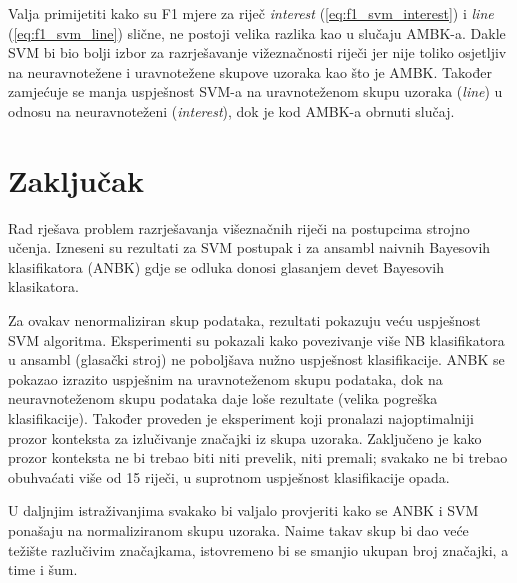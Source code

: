 \documentclass[10pt, a4paper]{article}
\begin{document}
Valja primijetiti kako su F1 mjere za riječ \emph{interest} (\ref{eq:f1_svm_interest}) i \emph{line} 
(\ref{eq:f1_svm_line}) slične, ne postoji velika razlika kao u slučaju AMBK-a.
Dakle SVM bi bio bolji izbor za razrješavanje vižeznačnosti riječi jer
nije toliko osjetljiv na neuravnotežene i uravnotežene skupove uzoraka
kao što je AMBK.
Također zamjećuje se manja uspješnost SVM-a na uravnoteženom
skupu uzoraka (\emph{line}) u odnosu na neuravnoteženi (\emph{interest}), 
dok je kod AMBK-a obrnuti slučaj.

\section{Zaključak}
Rad rješava problem razrješavanja višeznačnih riječi na postupcima
strojno učenja. Izneseni su rezultati za SVM postupak i za
ansambl naivnih Bayesovih klasifikatora (ANBK) gdje se odluka donosi
glasanjem devet Bayesovih klasikatora.

Za ovakav nenormaliziran skup podataka, rezultati pokazuju
veću uspješnost SVM algoritma. Eksperimenti su pokazali kako povezivanje više 
NB klasifikatora u ansambl (glasački stroj) ne poboljšava nužno uspješnost klasifikacije.
ANBK se pokazao
izrazito uspješnim na uravnoteženom skupu podataka, dok
na neuravnoteženom skupu podataka daje loše rezultate (velika
pogreška klasifikacije).
Također proveden je eksperiment
koji pronalazi najoptimalniji prozor konteksta za izlučivanje
značajki iz skupa uzoraka. Zaključeno je kako prozor konteksta ne bi trebao
biti niti prevelik, niti premali; svakako ne bi trebao obuhvaćati više od 15 riječi, 
u suprotnom uspješnost klasifikacije opada.

U daljnjim istraživanjima svakako bi valjalo provjeriti kako se ANBK i SVM ponašaju na
normaliziranom skupu uzoraka. Naime takav skup bi dao veće težište razlučivim značajkama,
istovremeno bi se smanjio ukupan broj značajki, a time i šum.


 
\end{document}
